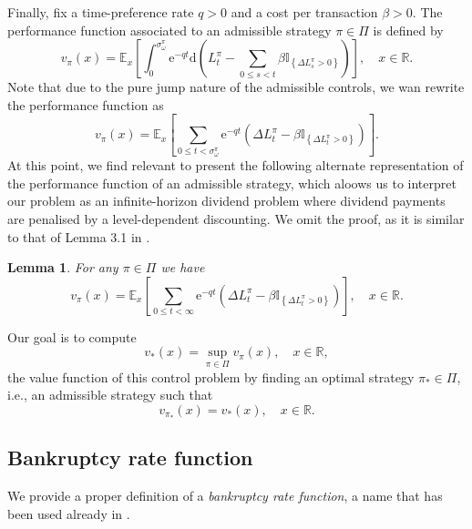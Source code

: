 \documentclass[10pt,a4paper]{amsart}
\newtheorem{lemma}{Lemma}[section]
\newcommand{\e}{\mathbb{E}}
\newcommand{\reals}{\mathbb{R}}
\newcommand{\Ind}{\mathbb{I}}
\newcommand{\diff}{\mathrm{d}}
\newcommand{\ruintime}{\sigma^\pi_\omega}
\newcommand{\BRA}[1]{{{\left\{#1\right\}}}} %
\newcommand{\PAR}[1]{{{\left(#1\right)}}} %
\newcommand{\SBRA}[1]{{{\left[#1\right]}}} %
\renewcommand{\leq}{\leqslant}
\begin{document}
Finally, fix a time-preference rate $q > 0$ and a cost per transaction $\beta > 0$. The performance function associated to an admissible strategy $\pi \in \Pi$ is defined by
\[
v_\pi (x) = \e_x \left[ \int_0^{\ruintime} \mathrm{e}^{-q t} \diff \PAR{L^\pi_t - \sum_{0 \leq s < t}\beta \Ind_{\BRA{\Delta L^\pi_s > 0}} } \right] , \quad x \in \reals .
\]
Note that due to the pure jump nature of the admissible controls, we wan rewrite the performance function as
\[
v_\pi (x) = \e_x\SBRA{\sum_{0 \leq t < \ruintime} \mathrm{e}^{-q t} \PAR{\Delta L^\pi_t - \beta \Ind_{\BRA{\Delta L^\pi_t > 0}} } }.
\]
At this point, we find relevant to present the following alternate representation of the performance function of an admissible strategy, which aloows us to interpret our problem as an infinite-horizon dividend problem where dividend payments are penalised by a level-dependent discounting. We omit the proof, as it is similar to that of Lemma 3.1 in \cite{mata-renaud_2024}.
\begin{lemma}\label{lem:alternate}
	For any $\pi \in \Pi$ we have
	\[
	v_\pi(x) = \e_x\SBRA{ \sum_{0 \leq t < \infty} \mathrm{e}^{-q t} \PAR{\Delta L^\pi_t - \beta \Ind_{\BRA{\Delta L^\pi_t > 0}} }}, \quad x \in \reals.
	\]
\end{lemma}
Our goal is to compute
\begin{equation}\label{eq.Value}
v_\ast (x) = \sup_{\pi \in \Pi} v_\pi (x) , \quad x \in \reals ,
\end{equation}
the value function of this control problem by finding an optimal strategy $\pi_\ast \in \Pi$, i.e., an admissible strategy such that
\[
v_{\pi_\ast} (x) = v_\ast (x) , \quad x \in \reals .
\]


\subsection{Bankruptcy rate function}

We provide a proper definition of a \textit{bankruptcy rate function}, a name that has been used already in \cite{gerber-et-al_2012}.
\end{document}
